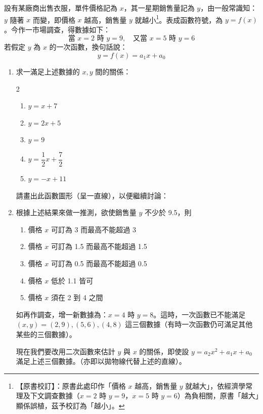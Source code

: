 \begin{discussion}[複選題]\label{ex:b6s-3-1}\label{disc:b6s-3-1}
設有某廠商出售衣服，單件價格記為 $x$，其一星期銷售量記為 $y$，由一般常識知：$y$ 隨著 $x$ 而變，即價格 $x$ 越高，銷售量 $y$ 就越小\label{note:b6s-ch3-p124-sales}\footnote{【原書校訂】：原書此處印作「價格 $x$ 越高，銷售量 $y$ 就越大」，依經濟學常理及下文調查數據（$x=2$ 時 $y=9$，$x=5$ 時 $y=6$）為負相關，原書「越大」顯係誤植，茲予校訂為「越小」。}。表成函數符號，為 $y=f(x)$。今作一市場調查，得數據如下：
\[ \text{當 } x=2 \text{ 時 } y=9, \quad \text{又當 } x=5 \text{ 時 } y=6 \]
若假定 $y$ 為 $x$ 的一次函數，換句話說：
\[ y = f(x) = a_1 x + a_0 \]

\begin{enumerate}[label=(\Roman*), leftmargin=2.5em]
  \item 求一滿足上述數據的 $x, y$ 間的關係：
  \begin{multicols}{2}
  \begin{enumerate}[label=(\Alph*)]
    \item $y = x+7$
    \item $y = 2x+5$
    \item $y = 9$
    \item $y = \dfrac{1}{2}x + \dfrac{7}{2}$
    \item $y = -x+11$
  \end{enumerate}
  \end{multicols}
  請畫出此函數圖形（呈一直線），以便繼續討論：

  \item 根據上述結果來做一推測，欲使銷售量 $y$ 不少於 9.5，則
  \begin{enumerate}[label=(\Alph*)]
    \item 價格 $x$ 可訂為 3 而最高不能超過 3
    \item 價格 $x$ 可訂為 1.5 而最高不能超過 1.5
    \item 價格 $x$ 可訂為 0.5 而最高不能超過 0.5
    \item 價格 $x$ 低於 1.1 皆可
    \item 價格 $x$ 須在 2 到 4 之間
  \end{enumerate}

  如再作調查，增一新數據為：$x=4$ 時 $y=8$。這時，一次函數已不能滿足 $(x,y)=(2,9), (5,6), (4,8)$ 這三個數據（有時一次函數仍可滿足其他某些的三個數據）。

  現在我們要改用二次函數來估計 $y$ 與 $x$ 的關係，即使設 $y=a_2 x^2 + a_1 x + a_0$ 滿足上述三個數據。（亦即以拋物線代替上述的直線）。


\end{enumerate}
\end{discussion}
